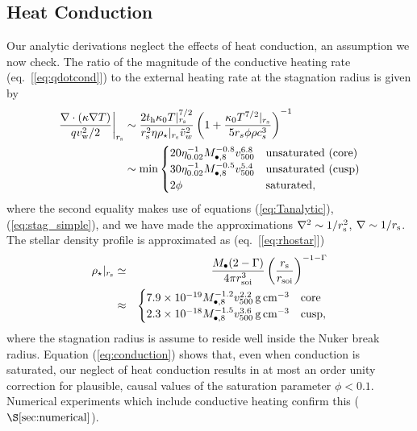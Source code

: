 \documentclass[usenatbib,fleqn]{mn2e}
\newcommand{\rs}{r_s}
\begin{document}
\subsection{Heat Conduction}
\label{sec:conductivity}

Our analytic derivations neglect the effects of heat conduction, an
assumption we now check.  The ratio of the magnitude of the conductive
heating rate (eq.~[\ref{eq:qdotcond}]) to the external heating rate at
the stagnation radius is given by
\begin{align}
  \left.\frac{\nabla\cdot(\kappa \nabla T)}{q v_{\rm
w}^{2}/2}\right|_{r_{\rm s}} &\sim \frac{2t_{\rm h}\kappa_0
T|_{r_{\rm s}}^{7/2}}{r_{\rm s}^{2}\eta \rho_{\star}|_{r_{\rm s}}
\tilde{v}_{w}^{2}}
 \left(1+\frac{\kappa_0 T^{7/2}|_{r_{\rm s}}}{5 \rs
    \phi \rho c_s^3}\right)^{-1}
\nonumber \\ &\sim {\rm min}
  \begin{cases}
  20 \eta_{0.02}^{-1}
M_{\bullet,8}^{-0.8} v_{500}^{6.8} &  \text{unsaturated (core)}\\
 30 \eta_{0.02}^{-1}
M_{\bullet,8}^{-0.5} v_{500}^{5.4} &  \text{unsaturated (cusp)}\\
  2 \phi & \text{saturated},
  \end{cases}
 \label{eq:conduction}
\end{align}
where the second equality makes use of equations (\ref{eq:Tanalytic}),
(\ref{eq:stag_simple}), and we have made the approximations $\nabla^{2} \sim
1/r_{\rm s}^{2}$, $\nabla \sim 1/r_{\rm s}$.  The
stellar density profile is approximated as (eq.~[\ref{eq:rhostar}])
\begin{eqnarray}
  \rho_{\star}|_{r_{\rm s}} &\simeq& \frac{M_{\bullet}(2-\Gamma)}{4\pi r_{\rm soi}^{3}}\left(\frac{r_{\rm s}}{r_{\rm soi}}\right)^{-1-\Gamma} \nonumber \\
 &\approx& \begin{cases}
    7.9 \times 10^{-19}M_{\bullet,8}^{-1.2}v_{500}^{2.2}\,{\rm g\,cm^{-3}}
    & \text{core} \\
    2.3 \times 10^{-18} M_{\bullet,8}^{-1.5}v_{500}^{3.6}
    \,{\rm g\,cm^{-3}}  & \text{cusp}, 
  \end{cases}
  \label{eq:rhostarrs}
\end{eqnarray}
where the stagnation radius is assume to reside well inside the Nuker
break radius.  Equation (\ref{eq:conduction}) shows that, even when conduction is saturated, our neglect of heat conduction
results in at most an order unity correction for plausible, causal values of
the saturation parameter $\phi < 0.1$.  Numerical experiments which include conductive heating confirm this
($\S\ref{sec:numerical}$).
\end{document}
